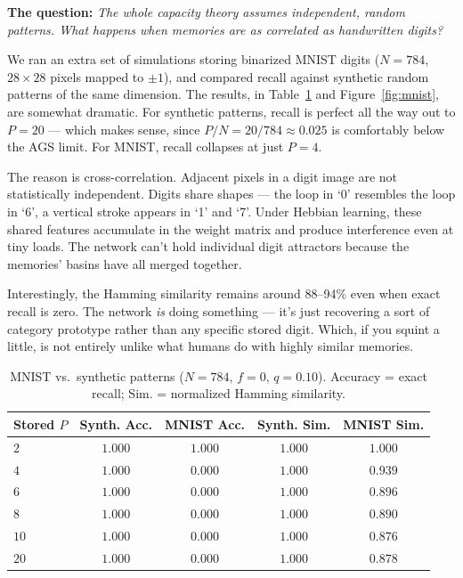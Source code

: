 \documentclass[11pt,a4paper]{article}
\begin{document}
\noindent\textbf{The question:} \textit{The whole capacity theory assumes independent, random patterns. What happens when memories are as correlated as handwritten digits?}

We ran an extra set of simulations storing binarized MNIST digits ($N=784$, $28\!\times\!28$ pixels mapped to $\pm 1$), and compared recall against synthetic random patterns of the same dimension. The results, in Table~\ref{tab:mnist} and Figure~\ref{fig:mnist}, are somewhat dramatic. For synthetic patterns, recall is perfect all the way out to $P=20$ --- which makes sense, since $P/N = 20/784 \approx 0.025$ is comfortably below the AGS limit. For MNIST, recall collapses at just $P=4$.

The reason is cross-correlation. Adjacent pixels in a digit image are not statistically independent. Digits share shapes --- the loop in `0' resembles the loop in `6', a vertical stroke appears in `1' and `7'. Under Hebbian learning, these shared features accumulate in the weight matrix and produce interference even at tiny loads. The network can't hold individual digit attractors because the memories' basins have all merged together.

Interestingly, the Hamming similarity remains around 88--94\% even when exact recall is zero. The network \textit{is} doing something --- it's just recovering a sort of category prototype rather than any specific stored digit. Which, if you squint a little, is not entirely unlike what humans do with highly similar memories.

\begin{table}[H]
\centering
\small
\caption{MNIST vs.\ synthetic patterns ($N=784$, $f=0$, $q=0.10$). Accuracy = exact recall; Sim. = normalized Hamming similarity.}
\label{tab:mnist}
\begin{tabular}{lcccc}
\toprule
\textbf{Stored $P$} & \textbf{Synth. Acc.} & \textbf{MNIST Acc.} & \textbf{Synth. Sim.} & \textbf{MNIST Sim.} \\
\midrule
$2$  & $1.000$ & $1.000$ & $1.000$ & $1.000$ \\
$4$  & $1.000$ & $0.000$ & $1.000$ & $0.939$ \\
$6$  & $1.000$ & $0.000$ & $1.000$ & $0.896$ \\
$8$  & $1.000$ & $0.000$ & $1.000$ & $0.890$ \\
$10$ & $1.000$ & $0.000$ & $1.000$ & $0.876$ \\
$20$ & $1.000$ & $0.000$ & $1.000$ & $0.878$ \\
\bottomrule
\end{tabular}
\end{table}
\end{document}
